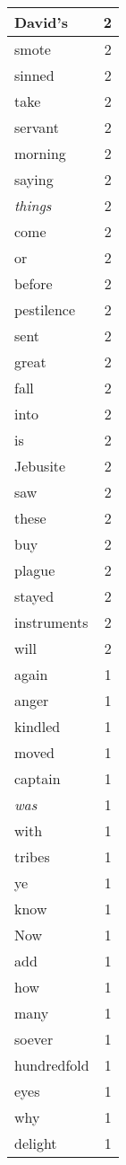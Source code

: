 \begin{center}
\begin{longtable}{l|r}
David's & 2 \\ \hline
smote & 2 \\ \hline
sinned & 2 \\ \hline
take & 2 \\ \hline
servant & 2 \\ \hline
morning & 2 \\ \hline
saying & 2 \\ \hline
\emph{things} & 2 \\ \hline
come & 2 \\ \hline
or & 2 \\ \hline
before & 2 \\ \hline
pestilence & 2 \\ \hline
sent & 2 \\ \hline
great & 2 \\ \hline
fall & 2 \\ \hline
into & 2 \\ \hline
is & 2 \\ \hline
Jebusite & 2 \\ \hline
saw & 2 \\ \hline
these & 2 \\ \hline
buy & 2 \\ \hline
plague & 2 \\ \hline
stayed & 2 \\ \hline
instruments & 2 \\ \hline
will & 2 \\ \hline
again & 1 \\ \hline
anger & 1 \\ \hline
kindled & 1 \\ \hline
moved & 1 \\ \hline
captain & 1 \\ \hline
\emph{was} & 1 \\ \hline
with & 1 \\ \hline
tribes & 1 \\ \hline
ye & 1 \\ \hline
know & 1 \\ \hline
Now & 1 \\ \hline
add & 1 \\ \hline
how & 1 \\ \hline
many & 1 \\ \hline
soever & 1 \\ \hline
hundredfold & 1 \\ \hline
eyes & 1 \\ \hline
why & 1 \\ \hline
delight & 1 \\ \hline

\end{longtable}
\end{center}
